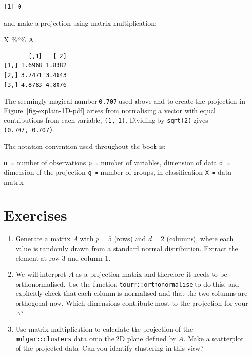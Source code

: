 \documentclass[
  letterpaper,
]{krantz}
\newenvironment{Shaded}{\begin{snugshade}}{\end{snugshade}}
\newcommand{\NormalTok}[1]{\textcolor[rgb]{0.00,0.23,0.31}{#1}}
\newcommand{\SpecialCharTok}[1]{\textcolor[rgb]{0.37,0.37,0.37}{#1}}
\providecommand{\tightlist}{%
  \setlength{\itemsep}{0pt}\setlength{\parskip}{0pt}}\usepackage{longtable,booktabs,array}
\begin{document}
\begin{verbatim}
[1] 0
\end{verbatim}

and make a projection using matrix multiplication:

\begin{Shaded}
\begin{Highlighting}[]
\NormalTok{X }\SpecialCharTok{\%*\%}\NormalTok{ A}
\end{Highlighting}
\end{Shaded}

\begin{verbatim}
       [,1]   [,2]
[1,] 1.6968 1.8382
[2,] 3.7471 3.4643
[3,] 4.8783 4.8076
\end{verbatim}

The seemingly magical number \texttt{0.707} used above and to create the
projection in Figure~\ref{fig-explain-1D-pdf} arises from normalising a
vector with equal contributions from each variable, \texttt{(1,\ 1)}.
Dividing by \texttt{sqrt(2)} gives \texttt{(0.707,\ 0.707)}.

The notation convention used throughout the book is:

\texttt{n\ =} number of observations \texttt{p\ =} number of variables,
dimension of data \texttt{d\ =} dimension of the projection
\texttt{g\ =} number of groups, in classification \texttt{X\ =} data
matrix

\hypertarget{exercises-1}{%
\section*{Exercises}\label{exercises-1}}


\begin{enumerate}
\def\labelenumi{\arabic{enumi}.}
\tightlist
\item
  Generate a matrix \(A\) with \(p=5\) (rows) and \(d=2\) (columns),
  where each value is randomly drawn from a standard normal
  distribution. Extract the element at row 3 and column 1.
\item
  We will interpret \(A\) as a projection matrix and therefore it needs
  to be orthonormalised. Use the function \texttt{tourr::orthonormalise}
  to do this, and explicitly check that each column is normalised and
  that the two columns are orthogonal now. Which dimensions contribute
  most to the projection for your \(A\)?
\item
  Use matrix multiplication to calculate the projection of the
  \texttt{mulgar::clusters} data onto the 2D plane defined by \(A\).
  Make a scatterplot of the projected data. Can you identify clustering
  in this view?
\end{enumerate}
\end{document}
